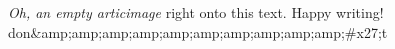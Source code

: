 \textit{Oh, an empty articimage} right onto this text. Happy writing! 
don&amp;amp;amp;amp;amp;amp;amp;amp;amp;amp;#x27;t
